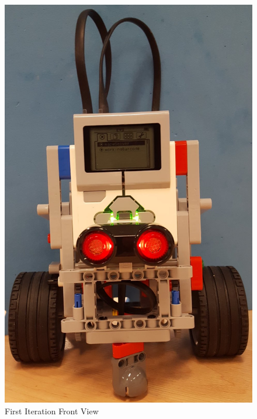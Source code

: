 \documentclass[11pt]{article}
\begin{document}
\begin{figure}[!tbp]
  \centering
  \begin{minipage}[b]{0.34\textwidth}
\includegraphics[scale=0.18]{images/Hardware_Mechanical/First_Iteration_Front.jpg}
\caption{First Iteration Front View}\label{fig:Front View}
  \end{minipage}
  \hfill
  \begin{minipage}[b]{0.4\textwidth}

\end{minipage}
\end{figure}
\end{document}
